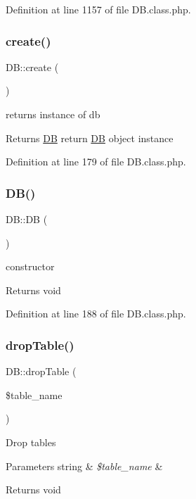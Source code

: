 Definition at line 1157 of file D\+B.\+class.\+php.

\hypertarget{classDB_aad22e845daa75ae9ca9b97f7e3a89749}{}\label{classDB_aad22e845daa75ae9ca9b97f7e3a89749} 
\subsubsection{\texorpdfstring{create()}{create()}}
{\footnotesize\ttfamily D\+B\+::create (\begin{DoxyParamCaption}{ }\end{DoxyParamCaption})}

returns instance of db \begin{DoxyReturn}{Returns}
\hyperlink{classDB}{DB} return \hyperlink{classDB}{DB} object instance 
\end{DoxyReturn}


Definition at line 179 of file D\+B.\+class.\+php.

\hypertarget{classDB_a29a603c52c10831cddee82518417f992}{}\label{classDB_a29a603c52c10831cddee82518417f992} 
\subsubsection{\texorpdfstring{D\+B()}{DB()}}
{\footnotesize\ttfamily D\+B\+::\+DB (\begin{DoxyParamCaption}{ }\end{DoxyParamCaption})}

constructor \begin{DoxyReturn}{Returns}
void 
\end{DoxyReturn}


Definition at line 188 of file D\+B.\+class.\+php.

\hypertarget{classDB_a63a3a5bdc8e30e1cee37cefddd5ce8de}{}\label{classDB_a63a3a5bdc8e30e1cee37cefddd5ce8de} 
\subsubsection{\texorpdfstring{drop\+Table()}{dropTable()}}
{\footnotesize\ttfamily D\+B\+::drop\+Table (\begin{DoxyParamCaption}\item[{}]{\$table\+\_\+name }\end{DoxyParamCaption})}

Drop tables 
\begin{DoxyParams}[1]{Parameters}
string & {\em \$table\+\_\+name} & \\
\hline
\end{DoxyParams}
\begin{DoxyReturn}{Returns}
void 
\end{DoxyReturn}


